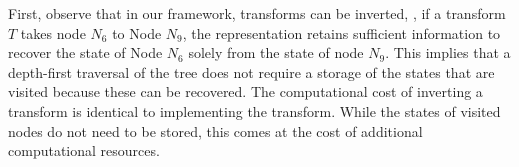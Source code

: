 
First, observe that in our framework, transforms can be inverted, \ie, if a transform $T$ takes node $N_6$ to Node $N_9$, the representation retains sufficient information to recover the state of Node $N_6$ solely from the state of node $N_9$. This implies that a depth-first traversal of the tree does not require a storage of the states that are visited because these can be recovered. The computational cost of inverting a transform is identical to implementing the transform. While the states of visited nodes do not need to be stored, this comes at the cost of additional computational resources.  






